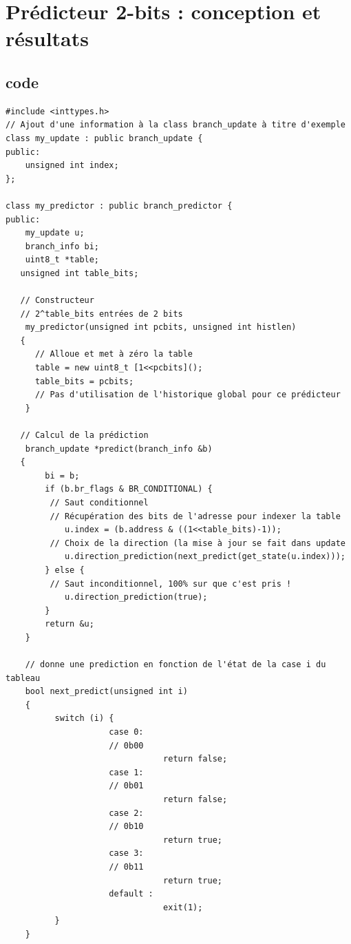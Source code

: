 \documentclass[a4paper]{article}
\begin{document}
\section{Prédicteur 2-bits : conception et résultats}
\subsection{code}

\small
\begin{verbatim}
#include <inttypes.h>
// Ajout d'une information à la class branch_update à titre d'exemple
class my_update : public branch_update {
public:
    unsigned int index;
};

class my_predictor : public branch_predictor {
public:
    my_update u;
    branch_info bi;
    uint8_t *table;
   unsigned int table_bits;

   // Constructeur
   // 2^table_bits entrées de 2 bits
    my_predictor(unsigned int pcbits, unsigned int histlen)
   { 
      // Alloue et met à zéro la table
      table = new uint8_t [1<<pcbits]();
      table_bits = pcbits;
      // Pas d'utilisation de l'historique global pour ce prédicteur
    }

   // Calcul de la prédiction
    branch_update *predict(branch_info &b)
   {
        bi = b;
        if (b.br_flags & BR_CONDITIONAL) {
         // Saut conditionnel
         // Récupération des bits de l'adresse pour indexer la table
            u.index = (b.address & ((1<<table_bits)-1));
         // Choix de la direction (la mise à jour se fait dans update
            u.direction_prediction(next_predict(get_state(u.index)));
        } else {
         // Saut inconditionnel, 100% sur que c'est pris !
            u.direction_prediction(true);
        }
        return &u;
    }

    // donne une prediction en fonction de l'état de la case i du tableau
    bool next_predict(unsigned int i) 
    {
          switch (i) {
                     case 0:
                     // 0b00
                                return false;
                     case 1:
                     // 0b01
                                return false;
                     case 2:
                     // 0b10
                                return true;
                     case 3:
                     // 0b11
                                return true;
                     default :
                                exit(1);
          }
    }


\end{verbatim}
\end{document}
